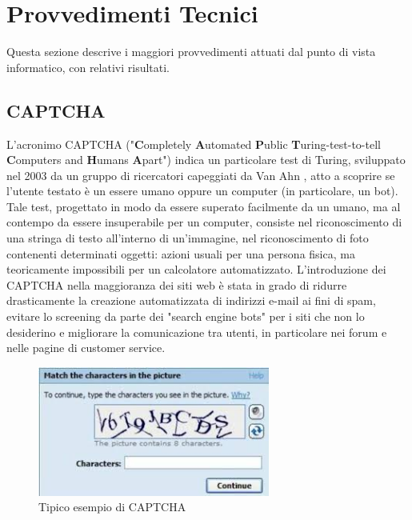 
\section{Provvedimenti Tecnici} \label{sec:tech}
Questa sezione descrive i maggiori provvedimenti attuati dal punto di vista informatico, con relativi risultati.
\subsection{CAPTCHA} \label{captcha}
L'acronimo CAPTCHA ("\textbf{C}ompletely \textbf{A}utomated \textbf{P}ublic \textbf{T}uring-test-to-tell \textbf{C}omputers and \textbf{H}umans \textbf{A}part") indica un particolare test di Turing, sviluppato nel 2003 da un gruppo di ricercatori capeggiati da Van Ahn \cite{von2003captcha}, atto a scoprire se l'utente testato è un essere umano oppure un computer (in particolare, un bot). Tale test, progettato in modo da essere superato facilmente da un umano, ma al contempo da essere insuperabile per un computer, consiste nel riconoscimento di una stringa di testo all'interno di un'immagine, nel riconoscimento di foto contenenti determinati oggetti: azioni usuali per una persona fisica, ma teoricamente impossibili per un calcolatore automatizzato. 
L'introduzione dei CAPTCHA nella  maggioranza dei siti web è stata in grado di ridurre drasticamente la creazione automatizzata di indirizzi e-mail ai fini di spam, evitare lo screening da parte dei "search engine bots" per i siti che non lo desiderino e migliorare la comunicazione tra utenti, in particolare nei forum e nelle pagine di customer service.
\begin{figure}[H]
	\centering
	\includegraphics[width=0.68\textwidth]{chapter3/immagini/captcha}
	\caption{Tipico esempio di CAPTCHA}
	\label{captcha}
\end{figure}
